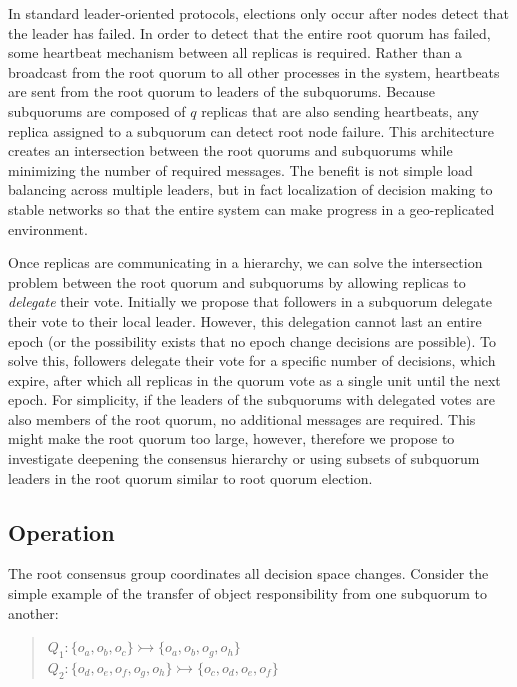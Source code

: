 \documentclass[sigconf]{acmart}
\begin{document}
In standard leader-oriented protocols, elections only occur after nodes detect that the
leader has failed.
In order to detect that the entire root quorum has failed, some heartbeat mechanism
between all replicas is required.
Rather than a broadcast from the root quorum to all other processes in the system,
heartbeats are sent from the root quorum to leaders of the subquorums.
Because subquorums are composed of $q$ replicas that are also sending heartbeats, any
replica assigned to a subquorum can detect root node failure.
This architecture creates an intersection between the root quorums and subquorums while
minimizing the number of required messages.
The benefit is not simple load balancing across multiple leaders, but in fact
localization of decision making to stable networks so that the entire system can make
progress in a geo-replicated environment.

Once replicas are communicating in a hierarchy, we can solve the intersection problem
between the root quorum and subquorums by allowing replicas to \emph{delegate} their
vote.
Initially we propose that followers in a subquorum delegate their vote to their local
leader.
However, this delegation cannot last an entire epoch (or the possibility exists that no
epoch change decisions are possible).
To solve this, followers delegate their vote for a specific number of decisions, which
expire, after which all replicas in the quorum vote as a single unit until the next
epoch.
For simplicity, if the leaders of the subquorums with delegated votes are also members of
the root quorum, no additional messages are required.
This might make the root quorum too large, however, therefore we propose to investigate
deepening the consensus hierarchy or using subsets of subquorum leaders in the root
quorum similar to root quorum election.

\subsection{Operation}

The root consensus group coordinates all decision space changes.
Consider the simple example of the transfer of object responsibility from one subquorum
to another:

\begin{quote}
\small
   $Q_1: \{o_a,o_b,o_c\} \rightarrowtail \{o_a,o_b,o_g,o_h\}$\\
   $Q_2: \{o_d,o_e,o_f,o_g,o_h\} \rightarrowtail \{o_c,o_d,o_e,o_f\}$
\end{quote}
\end{document}
